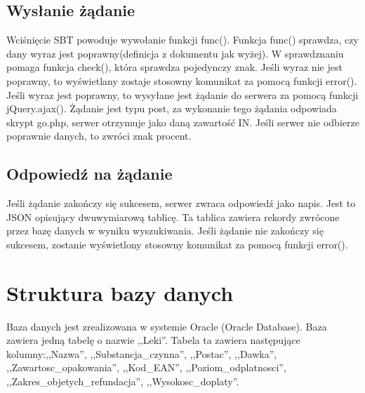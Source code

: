\documentclass[10pt, a4paper]{article}
\begin{document}
\subsection{Wysłanie żądanie}
Wciśnięcie SBT powoduje wywołanie funkcji func().
Funkcja func() sprawdza, czy dany wyraz jest poprawny(definicja z dokumentu jak wyżej). W sprawdznaniu pomaga funkcja check(), która sprawdza pojedynczy znak. Jeśli wyraz nie jest poprawny, to wyświetlany zostaje stosowny komunikat za pomocą funkcji error(). Jeśli wyraz jest poprawny, to wysyłane jest żądanie do serwera za pomocą funkcji jQuery.ajax(). Żądanie jest typu post, za wykonanie tego żądania odpowiada skrypt go.php, serwer otrzymuje jako daną zawartość IN. Jeśli serwer nie odbierze poprawnie danych, to zwróci znak procent.

\subsection{Odpowiedź na żądanie}
Jeśli żądanie zakończy się sukcesem, serwer zwraca odpowiedź jako napis. Jest to JSON opisujący dwuwymiarową tablicę. Ta tablica zawiera rekordy zwrócone przez bazę danych w wyniku wyszukiwania.
Jeśli żądanie nie zakończy się sukcesem, zostanie wyświetlony stosowny komunikat za pomocą funkcji error().

\section{Struktura bazy danych}
Baza danych jest zrealizowana w systemie Oracle (Oracle Database).
Baza zawiera jedną tabelę o nazwie ,,Leki''. Tabela ta zawiera następujące kolumny:,,Nazwa'', ,,Substancja\_czynna'',  ,,Postac'', ,,Dawka'', ,,Zawartosc\_opakowania'', ,,Kod\_EAN'', ,,Poziom\_odplatnosci'', ,,Zakres\_objetych\_refundacja'', ,,Wysokosc\_doplaty''.
\end{document}
